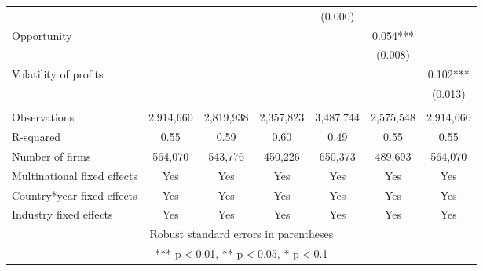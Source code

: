 \begin{tabular}{lcccccc}
 &  &  &  & (0.000) &  &  \\
Opportunity &  &  &  &  & 0.054*** &  \\
 &  &  &  &  & (0.008) &  \\
Volatility of profits &  &  &  &  &  & 0.102*** \\
 &  &  &  &  &  & (0.013) \\
 &  &  &  &  &  &  \\
Observations & 2,914,660 & 2,819,938 & 2,357,823 & 3,487,744 & 2,575,548 & 2,914,660 \\
R-squared & 0.55 & 0.59 & 0.60 & 0.49 & 0.55 & 0.55 \\
Number of firms & 564,070 & 543,776 & 450,226 & 650,373 & 489,693 & 564,070 \\
Multinational fixed effects & Yes & Yes & Yes & Yes & Yes & Yes \\
Country*year fixed effects & Yes & Yes & Yes & Yes & Yes & Yes \\
 Industry fixed effects & Yes & Yes & Yes & Yes & Yes & Yes \\ \hline
\multicolumn{7}{c}{ Robust standard errors in parentheses} \\
\multicolumn{7}{c}{ *** p$<$0.01, ** p$<$0.05, * p$<$0.1} \\
\end{tabular}
